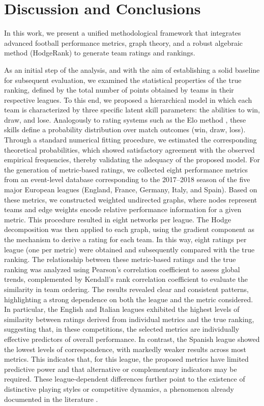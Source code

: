 \documentclass[preprint,12pt]{elsarticle}
\begin{document}
\section{Discussion and Conclusions}
\label{se:concl}

In this work, we present a unified methodological framework that integrates advanced football performance metrics, graph theory, and a robust algebraic method (HodgeRank) to generate team ratings and rankings.

As an initial step of the analysis, and with the aim of establishing a solid baseline for subsequent evaluation, we examined the statistical properties of the true ranking, defined by the total number of points obtained by teams in their respective leagues. To this end, we proposed a hierarchical model in which each team is characterized by three specific latent skill parameters: the abilities to win, draw, and lose. Analogously to rating systems such as the Elo method \cite{elo1978rating}, these skills define a probability distribution over match outcomes (win, draw, loss). Through a standard numerical fitting procedure, we estimated the corresponding theoretical probabilities, which showed satisfactory agreement with the observed empirical frequencies, thereby validating the adequacy of the proposed model.
%
For the generation of metric-based ratings, we collected eight performance metrics from an event-level database corresponding to the 2017--2018 season of the five major European leagues (England, France, Germany, Italy, and Spain). Based on these metrics, we constructed weighted undirected graphs, where nodes represent teams and edge weights encode relative performance information for a given metric. This procedure resulted in eight networks per league. The Hodge decomposition  was then applied to each graph, using the gradient component as the mechanism to derive a rating for each team. In this way, eight ratings per league (one per metric) were obtained and subsequently compared with the true ranking.
%
The relationship between these metric-based ratings and the true ranking was analyzed using Pearson’s correlation coefficient to assess global trends, complemented by Kendall’s rank correlation coefficient to evaluate the similarity in team ordering. The results revealed clear and consistent patterns, highlighting a strong dependence on both the league and the metric considered. In particular, the English and Italian leagues exhibited the highest levels of similarity between ratings derived from individual metrics and the true ranking, suggesting that, in these competitions, the selected metrics are individually effective predictors of overall performance. In contrast, the Spanish league showed the lowest levels of correspondence, with markedly weaker results across most metrics. This indicates that, for this league, the proposed metrics have limited predictive power and that alternative or complementary indicators may be required. These league-dependent differences further point to the existence of distinctive playing styles or competitive dynamics, a phenomenon already documented in the literature \cite{chacoma2025data}.
\end{document}
